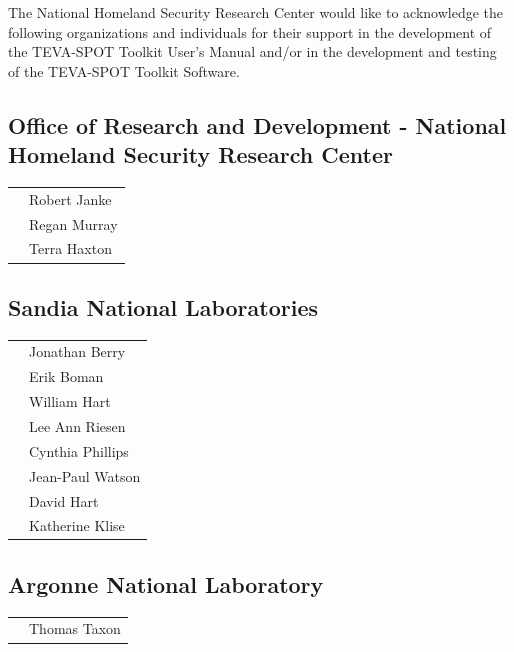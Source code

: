 The National Homeland Security Research Center would like to acknowledge 
the following organizations and individuals for their support in the
development of the TEVA-SPOT Toolkit User's Manual and/or in the development and
testing of the TEVA-SPOT Toolkit Software.

\subsection*{Office of Research and Development - National Homeland Security
  Research Center}
\begin{tabular}{ll}
& Robert Janke \\
& Regan Murray \\
& Terra Haxton \\
\end{tabular}


\subsection*{Sandia National Laboratories}
\begin{tabular}{ll}
& Jonathan Berry \\
& Erik Boman \\
& William Hart \\
& Lee Ann Riesen \\
& Cynthia Phillips \\
& Jean-Paul Watson\\
& David Hart\\
& Katherine Klise\\
\end{tabular}

\subsection*{Argonne National Laboratory}
\begin{tabular}{ll}
& Thomas Taxon\\
\end{tabular}

